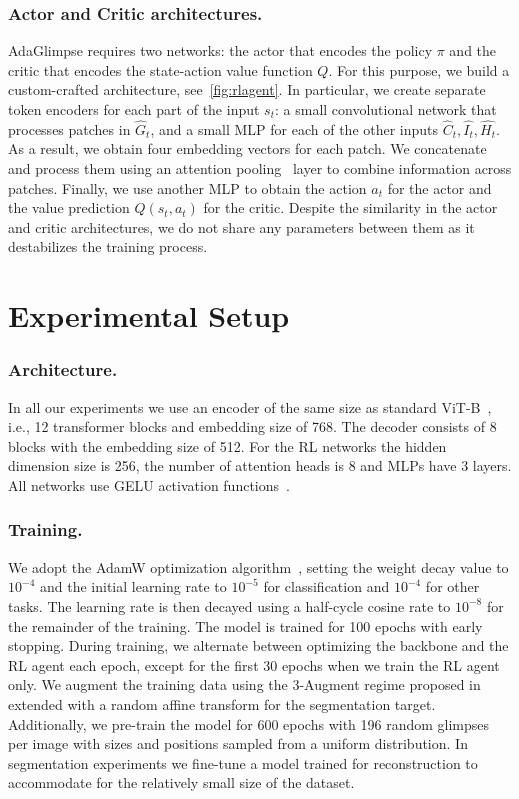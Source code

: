 \documentclass[runningheads]{llncs}
\newcommand{\ours}[0]{AdaGlimpse}
\begin{document}
\subsubsection{Actor and Critic architectures.}
\ours{} requires two networks: the actor that encodes the policy $\pi$ and the critic that encodes the state-action value function $Q$. For this purpose, we build a custom-crafted architecture, see~\cref{fig:rlagent}. In particular, we create separate token encoders for each part of the input $s_t$: a small convolutional network that processes patches in $\widehat{G}_t$, and a small MLP for each of the other inputs $\widehat{C}_t, \widehat{I_t}, \widehat{H_t}$. As a result, we obtain four embedding vectors for each patch. We concatenate and process them using an attention pooling~\cite{ilse2018attention} layer to combine information across patches. Finally, we use another MLP to obtain the action $a_{t}$ for the actor and the value prediction $Q(s_t, a_t)$ for the critic. Despite the similarity in the actor and critic architectures, we do not share any parameters between them as it destabilizes the training process.

\section{Experimental Setup}
\label{sec:setup}



\subsubsection{Architecture.}
In all our experiments we use an encoder of the same size as standard ViT-B~\cite{dosovitskiy2020vit}, i.e., 12 transformer blocks and embedding size of 768. The decoder consists of 8 blocks with the embedding size of 512. For the RL networks the hidden dimension size is 256, the number of attention heads is 8 and MLPs have 3 layers. All networks use GELU activation functions~\cite{hendrycks2016gaussian}.


\subsubsection{Training.}
We adopt the AdamW optimization algorithm~\cite{loshchilov2018decoupled}, setting the weight decay value to $10^{-4}$ and the initial learning rate to $10^{-5}$ for classification and $10^{-4}$ for other tasks. The learning rate is then decayed using a half-cycle cosine rate to $10^{-8}$ for the remainder of the training. The model is trained for 100 epochs with early stopping. During training, we alternate between optimizing the backbone and the RL agent each epoch, except for the first 30 epochs when we train the RL agent only. We augment the training data using the 3-Augment regime proposed in~\cite{touvron2022deit} extended with a random affine transform for the segmentation target. Additionally, we pre-train the model for 600 epochs with 196 random glimpses per image with sizes and positions sampled from a uniform distribution. In segmentation experiments we fine-tune a model trained for reconstruction to accommodate for the relatively small size of the dataset.
\end{document}
